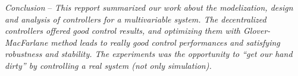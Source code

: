 \vspace{.5cm}
\hrulefill
\vspace{.5cm}

\begin{bfseries}
\emph{Conclusion} --
\emph{
    This repport summarized our work about the modelization, design and analysis of controllers for a multivariable system.
    The decentralized controllers offered good control results, and optimizing them with Glover-MacFarlane method leads to really good control performances and satisfying robustness and stability.
    The experiments was the opportunity to ``get our hand dirty'' by controlling a real system (not only simulation).
}
\end{bfseries}
